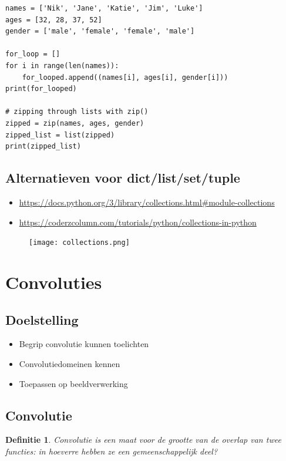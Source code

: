 \documentclass{article}
\newtheorem{theorem}{Definitie}[section]
\begin{document}
\begin{verbatim}
names = ['Nik', 'Jane', 'Katie', 'Jim', 'Luke']
ages = [32, 28, 37, 52]
gender = ['male', 'female', 'female', 'male']

for_loop = []
for i in range(len(names)):
    for_looped.append((names[i], ages[i], gender[i]))
print(for_looped)

# zipping through lists with zip()
zipped = zip(names, ages, gender)
zipped_list = list(zipped)
print(zipped_list)
\end{verbatim}

\subsection{Alternatieven voor dict/list/set/tuple}

\begin{itemize}
    \item \url{https://docs.python.org/3/library/collections.html#module-collections}
    \item \url{https://coderzcolumn.com/tutorials/python/collections-in-python}
\end{itemize}


\begin{figure}[H]
    \centering
    \texttt{[image: collections.png]}
\end{figure}

\section{Convoluties}

\subsection{Doelstelling}

\begin{itemize}
    \item Begrip convolutie kunnen toelichten
    \item Convolutiedomeinen kennen
    \item Toepassen op beeldverwerking
\end{itemize}

\subsection{Convolutie}

\begin{theorem}
    Convolutie is een maat voor de grootte van de overlap van twee functies: 
    in hoeverre hebben ze een gemeenschappelijk deel?
\end{theorem}
\end{document}
